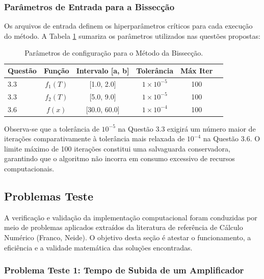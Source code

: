 \subsubsection{Parâmetros de Entrada para a Bissecção}
\label{subsubsec:parametros_entrada_bisseccao}

Os arquivos de entrada definem os hiperparâmetros críticos para cada execução do método. A Tabela \ref{tab:parametros_bisseccao} sumariza os parâmetros utilizados nas questões propostas:

\begin{table}[htpb]
\centering
\caption{Parâmetros de configuração para o Método da Bissecção.}
\label{tab:parametros_bisseccao}
\small
\begin{tabular}{@{}lccccc@{}}
\toprule
\textbf{Questão} & \textbf{Função} & \textbf{Intervalo [a, b]} & \textbf{Tolerância} & \textbf{Máx Iter} \\ \midrule
3.3 & $f_1(T)$ & [1.0, 2.0] & $1 \times 10^{-5}$ & 100 \\
3.3 & $f_2(T)$ & [5.0, 9.0] & $1 \times 10^{-5}$ & 100 \\
3.6 & $f(x)$ & [30.0, 60.0] & $1 \times 10^{-4}$ & 100 \\
\bottomrule
\end{tabular}
\end{table}

Observa-se que a tolerância de $10^{-5}$ na Questão 3.3 exigirá um número maior de iterações comparativamente à tolerância mais relaxada de $10^{-4}$ na Questão 3.6. O limite máximo de 100 iterações constitui uma salvaguarda conservadora, garantindo que o algoritmo não incorra em consumo excessivo de recursos computacionais.

\subsection{Problemas Teste}
\label{subsec:problemas_testes_bisseccao}

A verificação e validação da implementação computacional foram conduzidas por meio de problemas aplicados extraídos da literatura de referência de Cálculo Numérico (Franco, Neide). O objetivo desta seção é atestar o funcionamento, a eficiência e a validade matemática das soluções encontradas.

\subsubsection{Problema Teste 1: Tempo de Subida de um Amplificador}
\label{subsubsec:problema_teste_1_bisseccao}


